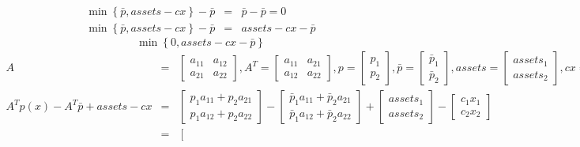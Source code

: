 \documentclass{article}
\begin{document}
\begin{eqnarray*}
\min \left\{ \bar{p},assets-cx\right\} -\bar{p} &=&\bar{p}-\bar{p}=0 \\
\min \left\{ \bar{p},assets-cx\right\} -\bar{p} &=&assets-cx-\bar{p}
\end{eqnarray*}%
\[
\min \left\{ 0,assets-cx-\bar{p}\right\} 
\]%
\begin{eqnarray*}
A &=&\left[ 
\begin{array}{cc}
a_{11} & a_{12} \\ 
a_{21} & a_{22}%
\end{array}%
\right] ,A^{T}=\left[ 
\begin{array}{cc}
a_{11} & a_{21} \\ 
a_{12} & a_{22}%
\end{array}%
\right] ,p=\left[ 
\begin{array}{c}
p_{1} \\ 
p_{2}%
\end{array}%
\right] ,\bar{p}=\left[ 
\begin{array}{c}
\bar{p}_{1} \\ 
\bar{p}_{2}%
\end{array}%
\right] ,assets=\left[ 
\begin{array}{c}
assets_{1} \\ 
assets_{2}%
\end{array}%
\right] ,cx=\left[ 
\begin{array}{c}
c_{1}x_{1} \\ 
c_{2}x_{2}%
\end{array}%
\right]  \\
A^{T}p\left( x\right) -A^{T}\bar{p}+assets-cx &=&\left[ 
\begin{array}{c}
p_{1}a_{11}+p_{2}a_{21} \\ 
p_{1}a_{12}+p_{2}a_{22}%
\end{array}%
\right] -\left[ 
\begin{array}{c}
\bar{p}_{1}a_{11}+\bar{p}_{2}a_{21} \\ 
\bar{p}_{1}a_{12}+\bar{p}_{2}a_{22}%
\end{array}%
\right] +\left[ 
\begin{array}{c}
assets_{1} \\ 
assets_{2}%
\end{array}%
\right] -\left[ 
\begin{array}{c}
c_{1}x_{1} \\ 
c_{2}x_{2}%
\end{array}%
\right]  \\
&=&\left[ 

\end{eqnarray*}
\end{document}

